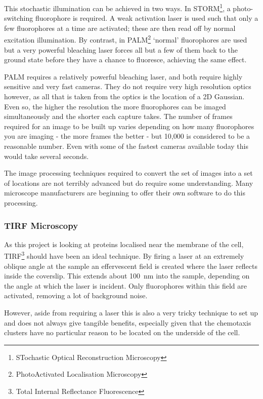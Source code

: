 \documentclass[../main.tex]{subfiles}
\begin{document}
This stochastic illumination can be achieved in two ways. In STORM\footnote{STochastic Optical Reconstruction Microscopy}, a photo-switching fluorophore is required. A weak activation laser is used such that only a few fluorophores at a time are activated; these are then read off by normal excitation illumination. By contrast, in PALM\footnote{PhotoActivated Localisation Microscopy} `normal' fluorophores are used but a very powerful bleaching laser forces all but a few of them back to the ground state before they have a chance to fluoresce, achieving the same effect.

PALM requires a relatively powerful bleaching laser, and both require highly sensitive and very fast cameras. They do not require very high resolution optics however, as all that is taken from the optics is the location of a 2D Gaussian. Even so, the higher the resolution the more fluorophores can be imaged simultaneously and the shorter each capture takes. The number of frames required for an image to be built up varies depending on how many fluorophores you are imaging - the more frames the better - but 10,000 is considered to be a reasonable number. Even with some of the fastest cameras available today this would take several seconds.

The image processing techniques required to convert the set of images into a set of locations are not terribly advanced but do require some understanding. Many microscope manufacturers are beginning to offer their own software to do this processing.

\subsubsection{TIRF Microscopy}
As this project is looking at proteins localised near the membrane of the cell, TIRF\footnote{Total Internal Reflectance Fluorescence} should have been an ideal technique. By firing a laser at an extremely oblique angle at the sample an effervescent field is created where the laser reflects inside the coverslip. This extends about \SI{100}{\nano\meter} into the sample, depending on the angle at which the laser is incident. Only fluorophores within this field are activated, removing a lot of background noise.

However, aside from requiring a laser this is also a very tricky technique to set up and does not always give tangible benefits, especially given that the chemotaxis clusters have no particular reason to be located on the underside of the cell.
\end{document}
